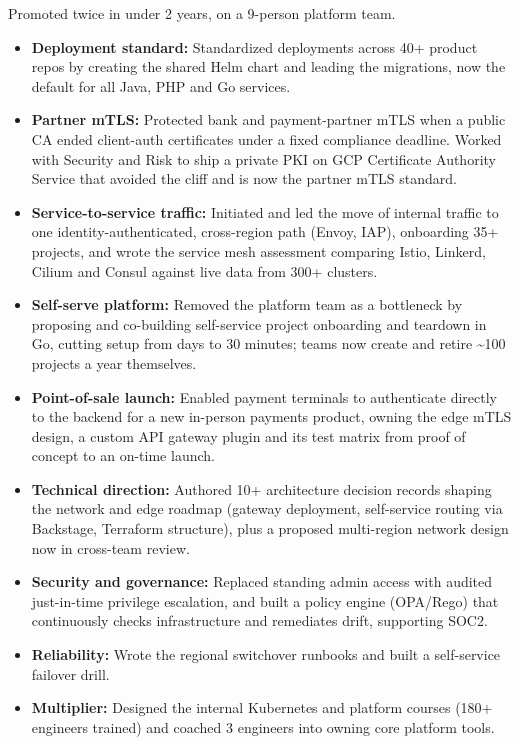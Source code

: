 \documentclass[a4paper,10pt]{article}
\begin{document}
\smallskip
Promoted twice in under 2 years, on a 9-person platform team.

\begin{itemize}
  \item \textbf{Deployment standard:} Standardized deployments across 40+ product repos by creating the shared Helm chart and leading the migrations, now the default for all Java, PHP and Go services.
  \item \textbf{Partner mTLS:} Protected bank and payment-partner mTLS when a public CA ended client-auth certificates under a fixed compliance deadline. Worked with Security and Risk to ship a private PKI on GCP Certificate Authority Service that avoided the cliff and is now the partner mTLS standard.
  \item \textbf{Service-to-service traffic:} Initiated and led the move of internal traffic to one identity-authenticated, cross-region path (Envoy, IAP), onboarding 35+ projects, and wrote the service mesh assessment comparing Istio, Linkerd, Cilium and Consul against live data from 300+ clusters.
  \item \textbf{Self-serve platform:} Removed the platform team as a bottleneck by proposing and co-building self-service project onboarding and teardown in Go, cutting setup from days to 30 minutes; teams now create and retire \textasciitilde{}100 projects a year themselves.
  \item \textbf{Point-of-sale launch:} Enabled payment terminals to authenticate directly to the backend for a new in-person payments product, owning the edge mTLS design, a custom API gateway plugin and its test matrix from proof of concept to an on-time launch.
  \item \textbf{Technical direction:} Authored 10+ architecture decision records shaping the network and edge roadmap (gateway deployment, self-service routing via Backstage, Terraform structure), plus a proposed multi-region network design now in cross-team review.
  \item \textbf{Security and governance:} Replaced standing admin access with audited just-in-time privilege escalation, and built a policy engine (OPA/Rego) that continuously checks infrastructure and remediates drift, supporting SOC2.
  \item \textbf{Reliability:} Wrote the regional switchover runbooks and built a self-service failover drill.
  \item \textbf{Multiplier:} Designed the internal Kubernetes and platform courses (180+ engineers trained) and coached 3 engineers into owning core platform tools.
\end{itemize}
\end{document}
